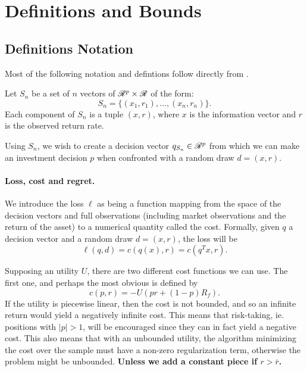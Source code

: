\section{Definitions and Bounds}

\subsection{Definitions Notation}

Most of the following notation and defintions follow directly from \cite{bousquet2002}.

Let $S_n$ be a set of $n$ vectors of $\mathscr{R}^p\times\mathscr{R}$ of the form:
\begin{equation*}
  S_n = \{(x_1,r_1),\ldots,(x_n,r_n)\}.
\end{equation*}
Each component of $S_n$ is a tuple $(x,r)$, where $x$ is the information vector and $r$ is
the observed return rate.

Using $S_n$, we wish to create a decision vector $q_{S_n}\in\mathscr{R}^p$ from which we can
make an investment decision $p$  when confronted with a random draw $d=(x,r)$.

\paragraph{Loss, cost and regret.}
We introduce the loss $\ell$ as being a function mapping from the space of the decision
vectors and full observations (including market observations and the return of the asset)
to a numerical quantity called the cost. Formally, given $q$ a decision vector and a
random draw $d=(x,r)$, the loss will be
\begin{equation*}
\ell(q,d) = c(q(x),r) = c(q^Tx,r).
\end{equation*}

Supposing an utility $U$, there are two different cost functions we can use. The first
one, and perhaps the most obvious is defined by
\begin{equation*}
  c(p,r) = -U(pr + (1-p)R_f).
\end{equation*}
If the utility is piecewise linear, then the cost is not bounded, and so an infinite
return would yield a negatively infinite cost. This means that risk-taking, ie. positions
with $|p|>1$, will be encouraged since they can in fact yield a negative cost. This also
means that with an unbounded utility, the algorithm minimizing the cost over the sample
must have a non-zero regularization term, otherwise the problem might be
unbounded. \textbf{Unless we add a constant piece if $r>\bar r$.}

